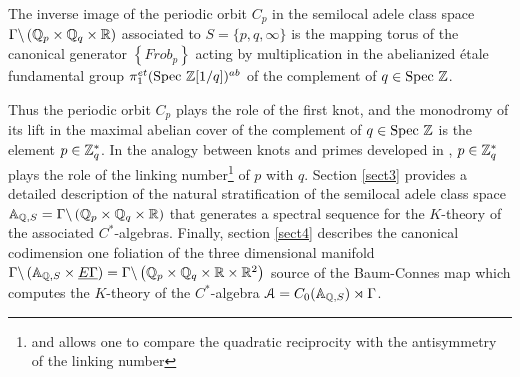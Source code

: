 \begin{thm}\label{mainintro} The  inverse image  of the periodic orbit $C_p$ in the semilocal adele class space $\Gamma\backslash\left({\mathbb Q}_p\times {\mathbb Q}_q\times \mathbb{R}\right)$ associated to  $S=\{ p, q,\infty \}$ is the mapping torus of the canonical generator $\left\{F r o b_{p}\right\}$ acting by multiplication in the abelianized \'etale fundamental group  $\pi_1^{e t}({\rm Spec\,} \, \mathbb{Z}[1/q])^{ab}$ of the complement of $q \in {\rm Spec\,}\, \mathbb{Z}$.	
\end{thm}
Thus  the periodic orbit $C_p$ plays the role of the first knot, and the monodromy of its lift  in the maximal abelian cover of the complement of $q \in {\rm Spec\,}\, \mathbb{Z}$ is the element $p\in \mathbb{Z}_q^*$. In the analogy between knots and primes developed in \cite{Mazur,Morishita,Morishita1}, $p\in \mathbb{Z}_q^*$  plays the role of the linking number\footnote{and allows one to compare the quadratic reciprocity with the antisymmetry of the linking number} of $p$ with $q$.\newline
Section \ref{sect3} provides a detailed description of the natural stratification of the semilocal adele class space ${\mathbb A}_{{\mathbb Q},S}=\Gamma\backslash\left({\mathbb Q}_p\times {\mathbb Q}_q\times \mathbb{R}\right)$ that generates a spectral sequence for the $K$-theory of the associated $C^*$-algebras.\newline
Finally, section \ref{sect4} describes the canonical 
 codimension one foliation of the three dimensional manifold $\Gamma\backslash\left({\mathbb A}_{{\mathbb Q},S}\times \underline{E \Gamma}\right) =\Gamma\backslash\left({\mathbb Q}_p\times {\mathbb Q}_q\times \mathbb{R} \times \mathbb{R}^2\right)$   source of the Baum-Connes map \cite{BC} which computes   the $K$-theory of the $C^*$-algebra $\mathcal{A}=C_0({\mathbb A}_{{\mathbb Q},S})\rtimes \Gamma$.


